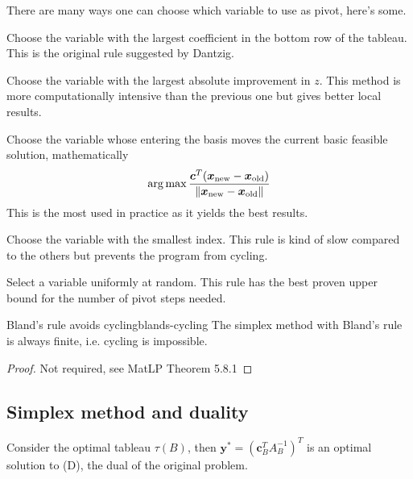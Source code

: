 \documentclass[12pt]{extarticle}
\renewcommand{\vec}[1]{\bm{#1}}
\begin{document}
There are many ways one can choose which variable to use as pivot, here's some.
\begin{description}[font=\normalfont\itshape]
	\item[Largest coefficient] Choose the variable with the largest coefficient in the bottom row of
	      the tableau. This is the original rule suggested by Dantzig.
	\item[Largest increase] Choose the variable with the largest absolute improvement in $z$. This
	      method is more computationally intensive than the previous one but gives better local results.
	\item[Steepest edge] Choose the variable whose entering the basis moves the current basic feasible
	      solution, mathematically
	      \begin{equation}
		      \argmax \frac{\vec c^T(\vec x_\text{new} - \vec x_\text{old})}
		      {\norm{\vec x_\text{new} - \vec x_\text{old}}}
	      \end{equation}
	      This is the most used in practice as it yields the best results.
	\item[Bland's rule] Choose the variable with the smallest index. This rule is kind of slow
	      compared to the others but prevents the program from cycling.
	\item[Random edge] Select a variable uniformly at random. This rule has the best proven upper
	      bound for the number of pivot steps needed.
\end{description}

\begin{theorem}{Bland's rule avoids cycling}{blands-cycling}
	The simplex method with Bland's rule is always finite, i.e. cycling is impossible.
\end{theorem}

\begin{proof}
	Not required, see MatLP Theorem 5.8.1
\end{proof}

\subsection{Simplex method and duality}

\begin{lemma}{}{}
	Consider the optimal tableau $\tau(B)$, then $\vec y^* = (\vec c^T_B A_B^{-1})^T$ is an optimal solution to
	(D), the dual of the original problem.
\end{lemma}
\end{document}
